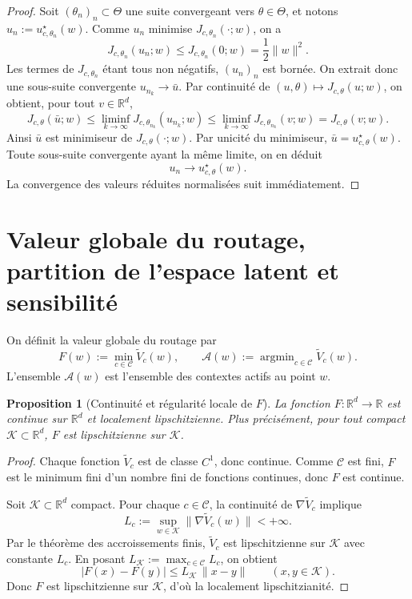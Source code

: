 \documentclass[11pt,a4paper]{article}
\newtheorem{proposition}{Proposition}[section]
\DeclareMathOperator{\argmin}{argmin}
\newcommand{\R}{\mathbb R}
\newcommand{\Ccal}{\mathcal C}
\begin{document}
\begin{proof}
Soit \((\theta_n)_n\subset\Theta\) une suite convergeant vers \(\theta\in\Theta\), et notons \(u_n:=u_{c,\theta_n}^\star(w)\). Comme \(u_n\) minimise \(J_{c,\theta_n}(\cdot;w)\), on a
\[
J_{c,\theta_n}(u_n;w)\le J_{c,\theta_n}(0;w)=\frac12\|w\|^2.
\]
Les termes de \(J_{c,\theta_n}\) étant tous non négatifs, \((u_n)_n\) est bornée. On extrait donc une sous-suite convergente \(u_{n_k}\to\bar u\). Par continuité de \((u,\theta)\mapsto J_{c,\theta}(u;w)\), on obtient, pour tout \(v\in\R^d\),
\[
J_{c,\theta}(\bar u;w)
\le
\liminf_{k\to\infty}J_{c,\theta_{n_k}}(u_{n_k};w)
\le
\liminf_{k\to\infty}J_{c,\theta_{n_k}}(v;w)
=
J_{c,\theta}(v;w).
\]
Ainsi \(\bar u\) est minimiseur de \(J_{c,\theta}(\cdot;w)\). Par unicité du minimiseur, \(\bar u=u_{c,\theta}^\star(w)\). Toute sous-suite convergente ayant la même limite, on en déduit
\[
u_n\to u_{c,\theta}^\star(w).
\]
La convergence des valeurs réduites normalisées suit immédiatement.
\end{proof}

\section{Valeur globale du routage, partition de l'espace latent et sensibilité}

On définit la valeur globale du routage par
\[
F(w):=\min_{c\in\Ccal}\widetilde V_c(w),
\qquad
\mathcal A(w):=\argmin_{c\in\Ccal}\widetilde V_c(w).
\]
L'ensemble \(\mathcal A(w)\) est l'ensemble des contextes actifs au point \(w\).

\begin{proposition}[Continuité et régularité locale de \(F\)]
La fonction \(F:\R^d\to\R\) est continue sur \(\R^d\) et localement lipschitzienne. Plus précisément, pour tout compact \(\mathcal K\subset\R^d\), \(F\) est lipschitzienne sur \(\mathcal K\).
\end{proposition}

\begin{proof}
Chaque fonction \(\widetilde V_c\) est de classe \(C^1\), donc continue. Comme \(\Ccal\) est fini, \(F\) est le minimum fini d'un nombre fini de fonctions continues, donc \(F\) est continue.

Soit \(\mathcal K\subset\R^d\) compact. Pour chaque \(c\in\Ccal\), la continuité de \(\nabla \widetilde V_c\) implique
\[
L_c:=\sup_{w\in\mathcal K}\|\nabla \widetilde V_c(w)\|<+\infty.
\]
Par le théorème des accroissements finis, \(\widetilde V_c\) est lipschitzienne sur \(\mathcal K\) avec constante \(L_c\). En posant \(L_{\mathcal K}:=\max_{c\in\Ccal}L_c\), on obtient
\[
|F(x)-F(y)|
\le
L_{\mathcal K}\,\|x-y\|
\qquad (x,y\in\mathcal K).
\]
Donc \(F\) est lipschitzienne sur \(\mathcal K\), d'où la localement lipschitzianité.
\end{proof}
\end{document}
